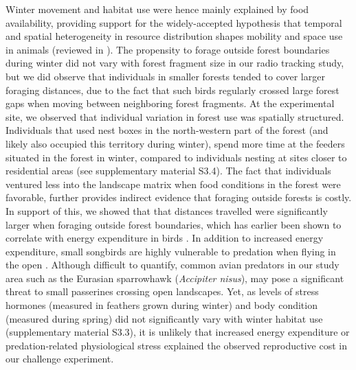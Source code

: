 \documentclass[10pt, twoside]{book} %
\begin{document}
Winter movement and habitat use were hence mainly explained by food availability, providing support for the widely-accepted hypothesis that temporal and spatial heterogeneity in resource distribution shapes mobility and space use in animals (reviewed in \citealt{Boutin1990}). The propensity to forage outside forest boundaries during winter did not vary with forest fragment size in our radio tracking study, but we did observe that individuals in smaller forests tended to cover larger foraging distances, due to the fact that such birds regularly crossed large forest gaps when moving between neighboring forest fragments. At the experimental site, we observed that individual variation in forest use was spatially structured. Individuals that used nest boxes in the north-western part of the forest (and likely also occupied this territory during winter), spend more time at the feeders situated in the forest in winter, compared to individuals nesting at sites closer to residential areas (see supplementary material S3.4). The fact that individuals ventured less into the landscape matrix when food conditions in the forest were favorable, further provides indirect evidence that foraging outside forests is costly. In support of this, we showed that that distances travelled were significantly larger when foraging outside forest boundaries, which has earlier been shown to correlate with energy expenditure in birds \citep{Hinsley2000, Hinsley2008}. In addition to increased energy expenditure, small songbirds are highly vulnerable to predation when flying in the open \citep{Lima1990, Desrochers1997}. Although difficult to quantify, common avian predators in our study area such as the Eurasian sparrowhawk (\textit{Accipiter nisus}), may pose a significant threat to small passerines crossing open landscapes. Yet, as levels of stress hormones (measured in feathers grown during winter) and body condition (measured during spring) did not significantly vary with winter habitat use (supplementary material S3.3), it is unlikely that increased energy expenditure or predation-related physiological stress explained the observed reproductive cost in our challenge experiment.\\
\end{document}
